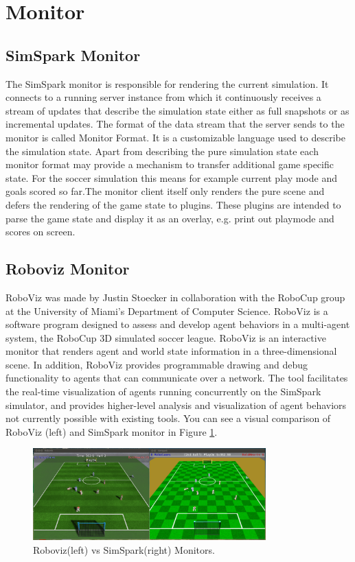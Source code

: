 \section{Monitor}
\subsection{SimSpark Monitor}
The SimSpark monitor is responsible for rendering the current simulation. It connects to a running server instance from which it continuously receives a stream of updates that describe the simulation state either as full snapshots or as incremental updates.
The format of the data stream that the server sends to the monitor is called Monitor Format. It is a customizable language used to describe the simulation state.
Apart from describing the pure simulation state each monitor format may provide a mechanism to transfer additional game specific state. For the soccer simulation this means for example current play mode and goals scored so far.The monitor client itself only renders the pure scene and defers the rendering of the game state to plugins. These plugins are intended to parse the game state and display it as an overlay, e.g. print out playmode and scores on screen.\cite{SimSpark}
\subsection{Roboviz Monitor}
RoboViz was made by Justin Stoecker in collaboration with the RoboCup group at the University of Miami's Department of Computer Science.
RoboViz is a software program designed to assess and develop agent behaviors in a multi-agent system, the RoboCup 3D simulated soccer league. RoboViz is an interactive monitor that renders agent and world state information in a three-dimensional scene. In addition, RoboViz provides programmable drawing and debug functionality to agents that can communicate over a network. The tool facilitates the real-time visualization of agents running concurrently on the SimSpark simulator, and provides higher-level analysis and visualization of agent behaviors not currently possible with existing tools. You can see a visual comparison of RoboViz (left) and SimSpark monitor in Figure \ref{fig:Roboviz}.\cite{roboviz}
\begin{figure}[ht!]
\centering
  \includegraphics[width=0.8\textwidth]{Chapter2/figures/comp2.png}
  \caption{Roboviz(left) vs SimSpark(right) Monitors.} 
  \label{fig:Roboviz}
\end{figure}



